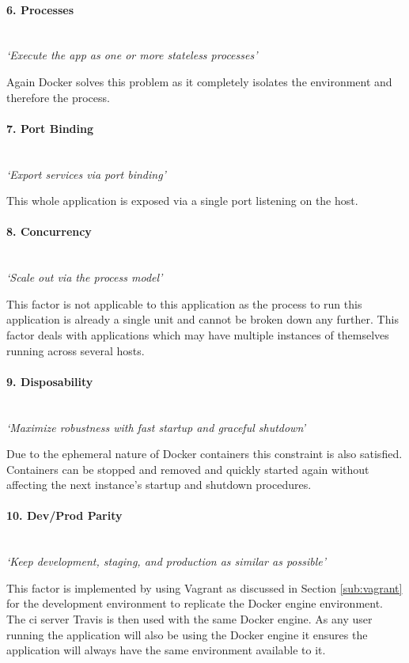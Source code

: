 \paragraph{6. Processes}\mbox{}\\
\textit{`Execute the app as one or more stateless processes'}

Again Docker solves this problem as it completely isolates the environment and therefore the process.

\paragraph{7. Port Binding}\mbox{}\\
\textit{`Export services via port binding'}

This whole application is exposed via a single port listening on the host.

\paragraph{8. Concurrency}\mbox{}\\
\textit{`Scale out via the process model'}

This factor is not applicable to this application as the process to run this application is already a single unit and cannot be broken down any further. This factor deals with applications which may have multiple instances of themselves running across several hosts.

\paragraph{9. Disposability}\mbox{}\\
\textit{`Maximize robustness with fast startup and graceful shutdown'}

Due to the ephemeral nature of \gls{Docker container}s this constraint is also satisfied. Containers can be stopped and removed and quickly started again without affecting the next instance's startup and shutdown procedures.

\paragraph{10. Dev/Prod Parity}\mbox{}\\
\textit{`Keep development, staging, and production as similar as possible'}

This factor is implemented by using Vagrant as discussed in Section \ref{sub:vagrant} for the development environment to replicate the Docker engine environment. The \gls{ci} server Travis is then used with the same Docker engine. As any user running the application will also be using the Docker engine it ensures the application will always have the same environment available to it.

